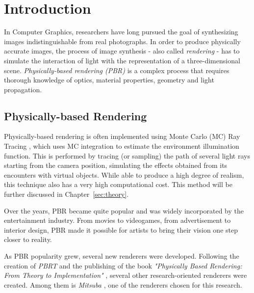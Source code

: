 \chapter{Introduction}
\label{sec:intro}

In Computer Graphics, 
researchers  have long pursued the goal of synthesizing images indistinguishable 
from real photographs. In order to produce physically accurate images, the 
process of image synthesis - also called \textit{rendering} - has to simulate the 
interaction of light with the representation of a three-dimensional scene. 
%
\textit{Physically-based rendering (PBR)} is a complex process that requires 
thorough knowledge of optics, material properties, geometry and light 
propagation.

\section{Physically-based Rendering}
Physically-based rendering is often implemented using Monte Carlo (MC) Ray Tracing \cite{mcraytracing}, which uses MC 
integration \cite{montecarlo} to estimate the environment illumination function. 
This is performed by tracing (or sampling) the path of several light rays starting from the camera position, simulating the effects obtained from its encounters with virtual objects. 
While able to produce a high degree of realism, this technique also has a very 
high computational cost. This method will be further discussed in Chapter~\ref{sec:theory}.

Over the years, PBR became quite popular and was widely incorporated by the 
entertainment industry. From movies to videogames, from advertisement to interior 
design, PBR made it possible for artists to bring their 
vision one step closer to reality. 

As PBR popularity grew, several new renderers were developed.
Following the creation of \textit{PBRT} and the publishing of the book 
\textit{"Physically Based Rendering: From Theory to Implementation"} 
\cite{pbrt}, several other research-oriented renderers were created. Among them 
is \textit{Mitsuba} \cite{mitsuba}, one of the renderers chosen for this research.

